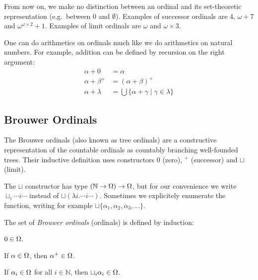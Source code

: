 From now on, we make no distinction between an ordinal and its set-theoretic
representation (e.g.\ between $0$ and $\emptyset$). Examples of successor
ordinals are $4$, $\omega + 7$  and $\omega^{\omega \times 2} + 1$. Examples
of limit ordinals are $\omega$ and $\omega \times 3$.


One can do arithmetics on ordinals much like we do arithmetics on natural
numbers. For example, addition can be defined by recursion on the right
argument:
\begin{align*}
  \alpha + 0       &= \alpha\\
  \alpha + \beta^+ &= (\alpha + \beta)^+\\
  \alpha + \lambda &= \bigcup \{ \alpha + \gamma \; | \; \gamma \in \lambda \}
\end{align*}


\subsection{Brouwer Ordinals}\label{sub:brouwer}

The Brouwer ordinals (also known as tree ordinals) are a constructive
representation of the countable ordinals as countably branching well-founded
trees. Their inductive definition uses constructors $0$ (zero), $^+$
(successor) and $\sqcup$ (limit).

The $\sqcup$ constructor has type $(\mathbb{N} \rightarrow \Omega) \rightarrow
\Omega$, but for our convenience we write $\sqcup_i \cdots i \cdots$ instead
of $\sqcup (\lambda i . \cdots i \cdots)$. Sometimes we explicitely enumerate
the function, writing for example $\sqcup \{ \alpha_1, \alpha_2, \alpha_3,
\ldots \}$.

\begin{definition}\label{def:ordinals}%
The set of \emph{Brouwer ordinals} (ordinals) \Ord is defined by
induction:
\begin{compactenum}
  \item
    $0 \in \Omega$.
  \item
    If $\alpha \in \Omega$, then $\alpha^+ \in \Omega$.
  \item
    If $\alpha_i \in \Omega$ for all $i \in \mathbb{N}$, then $\sqcup_i
    \alpha_i \in \Omega$.
\end{compactenum}
\end{definition}

